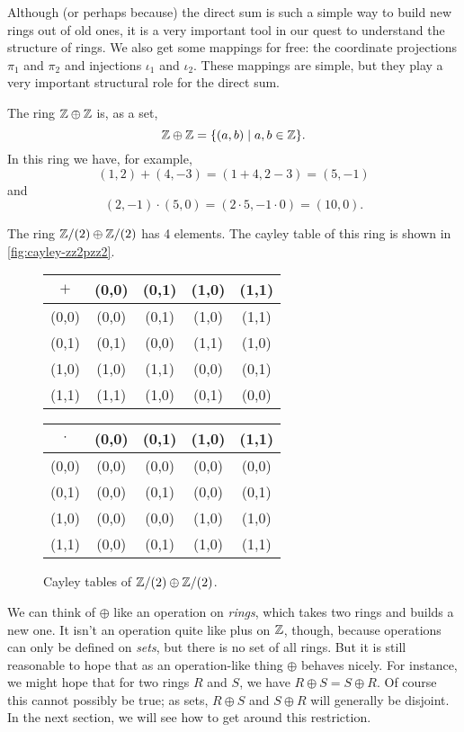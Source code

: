 Although (or perhaps because) the direct sum is such a simple way to build new rings out of old ones, it is a very important tool in our quest to understand the structure of rings.
We also get some mappings for free: the coordinate projections \(\pi_1\) and \(\pi_2\) and injections \(\iota_1\) and \(\iota_2\).
These mappings are simple, but they play a very important structural role for the direct sum.

\begin{examples}
\item The ring \(\mathbb{Z} \oplus \mathbb{Z}\) is, as a set, \[ \mathbb{Z} \oplus \mathbb{Z} = \{ (a,b) \mid a,b \in \mathbb{Z} \}. \]
In this ring we have, for example, \[ (1,2) + (4,-3) = (1+4, 2-3) = (5,-1) \] and \[ (2,-1) \cdot (5,0) = (2 \cdot 5, -1 \cdot 0) = (10,0). \]
\item The ring \(\mathbb{Z}/(2) \oplus \mathbb{Z}/(2)\) has 4 elements.
The cayley table of this ring is shown in \autoref{fig:cayley-zz2pzz2}.
\begin{figure}[h!]
\begin{center}
\small
\addtolength{\tabcolsep}{-2pt}
\begin{tabular}{c|cccc}
\(+\) & (0,0) & (0,1) & (1,0) & (1,1) \\ \hline
(0,0) & (0,0) & (0,1) & (1,0) & (1,1) \\
(0,1) & (0,1) & (0,0) & (1,1) & (1,0) \\
(1,0) & (1,0) & (1,1) & (0,0) & (0,1) \\
(1,1) & (1,1) & (1,0) & (0,1) & (0,0)
\end{tabular}
\quad
\begin{tabular}{c|cccc} \setlength{\tabcolsep}{5pt}
\(\cdot\)
      & (0,0) & (0,1) & (1,0) & (1,1) \\ \hline
(0,0) & (0,0) & (0,0) & (0,0) & (0,0) \\
(0,1) & (0,0) & (0,1) & (0,0) & (0,1) \\
(1,0) & (0,0) & (0,0) & (1,0) & (1,0) \\
(1,1) & (0,0) & (0,1) & (1,0) & (1,1)
\end{tabular}
\addtolength{\tabcolsep}{2pt}
\end{center}
\caption{\label{fig:cayley-zz2pzz2} Cayley tables of \(\mathbb{Z}/(2) \oplus \mathbb{Z}/(2)\).}
\end{figure}
\end{examples}

We can think of \(\oplus\) like an operation on \emph{rings}, which takes two rings and builds a new one.
It isn't an operation quite like plus on \(\mathbb{Z}\), though, because operations can only be defined on \emph{sets}, but there is no set of all rings.
But it is still reasonable to hope that as an operation-like thing \(\oplus\) behaves nicely.
For instance, we might hope that for two rings \(R\) and \(S\), we have \(R \oplus S = S \oplus R\).
Of course this cannot possibly be true; as sets, \(R \oplus S\) and \(S \oplus R\) will generally be disjoint.
In the next section, we will see how to get around this restriction.

